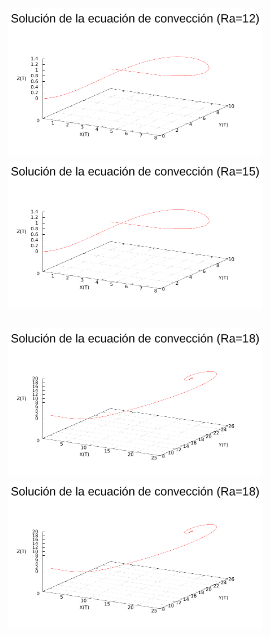 \begin{figure} [H]
\hspace{-1cm} \includegraphics[width=0.6\textwidth]{./parte4/graficos/grafico_P3_3d_ra12.pdf}\includegraphics[width=0.6\textwidth]{./parte4/graficos/grafico_P3_3d_ra15.pdf}
\caption{} 
\end{figure}

\begin{figure} [H]
\hspace{-1cm} \includegraphics[width=0.6\textwidth]{./parte4/graficos/grafico_P3_3d_ra18.pdf}\includegraphics[width=0.6\textwidth]{./parte4/graficos/grafico_P3_3d_ra18.pdf}
\caption{} 
\end{figure}

